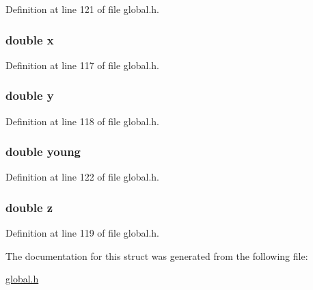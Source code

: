 Definition at line 121 of file global.\-h.

\hypertarget{structpartData_af88b946fb90d5f08b5fb740c70e98c10}{
\subsubsection[{x}]{\setlength{\rightskip}{0pt plus 5cm}double x}}\label{structpartData_af88b946fb90d5f08b5fb740c70e98c10}


Definition at line 117 of file global.\-h.

\hypertarget{structpartData_ab927965981178aa1fba979a37168db2a}{
\subsubsection[{y}]{\setlength{\rightskip}{0pt plus 5cm}double y}}\label{structpartData_ab927965981178aa1fba979a37168db2a}


Definition at line 118 of file global.\-h.

\hypertarget{structpartData_a47ec3689b1fd89ba8e75d9a9975ba63f}{
\subsubsection[{young}]{\setlength{\rightskip}{0pt plus 5cm}double young}}\label{structpartData_a47ec3689b1fd89ba8e75d9a9975ba63f}


Definition at line 122 of file global.\-h.

\hypertarget{structpartData_ab3e6ed577a7c669c19de1f9c1b46c872}{
\subsubsection[{z}]{\setlength{\rightskip}{0pt plus 5cm}double z}}\label{structpartData_ab3e6ed577a7c669c19de1f9c1b46c872}


Definition at line 119 of file global.\-h.



The documentation for this struct was generated from the following file\-:\begin{DoxyCompactItemize}
\item 
\hyperlink{global_8h}{global.\-h}\end{DoxyCompactItemize}
